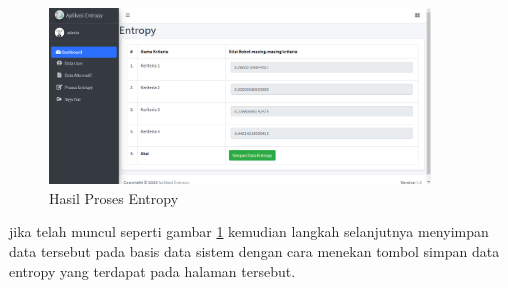 \begin{figure}[!htbp]
	\centerline{\includegraphics[width=0.90\textwidth]{figures/en/2.png}}
	\caption{Hasil Proses Entropy}
	\label{en2}
\end{figure}

jika telah muncul seperti gambar \ref{en2} kemudian langkah selanjutnya menyimpan data tersebut pada basis data sistem dengan cara menekan tombol simpan data entropy yang terdapat pada halaman tersebut.








